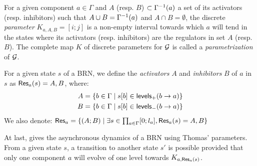\begin{definition}\label{def:param}
For a given component $a \in \Gamma$ and $A$ (resp. $B$) $\subset \Gamma^{-1}(a)$ a set of its activators (resp. inhibitors) such that $A \cup B = \Gamma^{-1}(a)$ and $A \cap B = \emptyset$,
the discrete \emph{parameter} $K_{a,A,B} = [i; j]$ is a non-empty interval towards which $a$ will tend
in the states where its activators (resp. inhibitors) are the regulators in set $A$ (resp. $B$).
The complete map $K$ of discrete parameters for $\mathcal{G}$ is called a \emph{parametrization} of $\mathcal{G}$.
\end{definition}

\begin{definition}\label{def:resources}
For a given state $s$ of a BRN, we define the \emph{activators} $A$ and \emph{inhibitors} $B$ of $a$ in $s$ as $\mathsf{Res}_{a}(s) = A,B$, where:
\begin{align*}
  A &= \{b \in \Gamma \mid {s[b]} \in \mathsf{levels}_+(b\rightarrow a)\} \\
  B &= \{b \in \Gamma \mid {s[b]} \in \mathsf{levels}_-(b\rightarrow a)\}
\end{align*}
We also denote: $\mathsf{Res}_{a} = \{(A;B) \mid \exists s \in \textstyle\prod_{a \in \Gamma} [0;l_a], \mathsf{Res}_{a}(s) = A,B\}$
\end{definition}


At last,  gives the asynchronous dynamics of a BRN using Thomas' parameters.
From a given state $s$, a transition to another state $s'$ is possible provided that only one component $a$ will evolve of one level towards $K_{a,\mathsf{Res}_{a}(s)}$.

